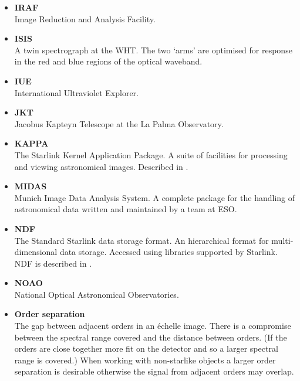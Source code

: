\begin{itemize}
\item {\bf\label{gl_iraf}IRAF}\\
      Image Reduction and Analysis Facility.

\item {\bf\label{gl_isis}ISIS}\\
      A twin spectrograph at the WHT.  The two `arms' are optimised
      for response in the red and blue regions of the optical waveband.

\item {\bf\label{gl_iue}IUE}\\
      International Ultraviolet Explorer.

\item {\bf\label{gl_jkt}JKT}\\
      Jacobus Kapteyn Telescope at the La Palma Observatory.

\item {\bf\label{gl_kappa}KAPPA}\\
      The Starlink Kernel Application Package.  A suite of facilities
      for processing and viewing astronomical images.
      Described in .

\item {\bf\label{gl_midas}MIDAS}\\
      Munich Image Data Analysis System.  A complete package for the
      handling of astronomical data written and maintained by a team
      at ESO.

\item {\bf\label{gl_ndf}NDF}\\
      The Standard Starlink data storage format.  An hierarchical format for
      multi-dimensional data storage.  Accessed using libraries supported
      by Starlink.  NDF is described in .

\item {\bf\label{gl_noao}NOAO}\\
      National Optical Astronomical Observatories.

\item {\bf\label{gl_order_separation}Order separation}\\
      The gap between adjacent orders in an \'{e}chelle image.
      There is a compromise between the spectral range covered and the
      distance between orders.  (If the orders are close together more fit
      on the detector and so a larger spectral range is covered.)
      When working with non-starlike objects a larger order separation
      is desirable otherwise the signal from adjacent orders may overlap.


\end{itemize}
